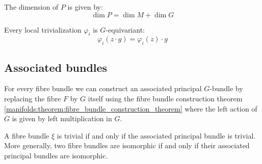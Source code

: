 	\begin{property}[Dimension]
		The dimension of $P$ is given by:
		\begin{equation}
			\label{manifolds:principal_bundle_dimension}
			\dim P = \dim M + \dim G
		\end{equation}
	\end{property}

	\begin{property}
		Every local trivialization $\varphi_i$ is $G$-equivariant:
		\begin{equation}
			\varphi_i(z\cdot g) = \varphi_i(z)\cdot g
		\end{equation}
	\end{property}
	

\subsection{Associated bundles}
	
	\begin{construct}
		For every fibre bundle we can construct an associated principal $G$-bundle by replacing the fibre $F$ by $G$ itself using the fibre bundle construction theorem \ref{manifolds:theorem:fibre_bundle_construction_theorem} where the left action of $G$ is given by left multiplication in $G$.
	\end{construct}	
	
	\begin{property}
		A fibre bundle $\xi$ is trivial if and only if the associated principal bundle is trivial. More generally, two fibre bundles are isomorphic if and only if their associated principal bundles are isomorphic.
	\end{property}
	
